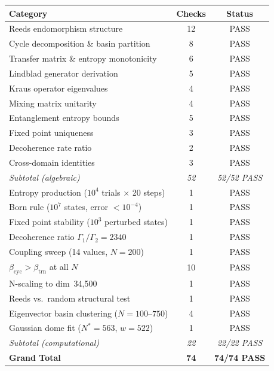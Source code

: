 \documentclass[12pt,a4paper]{article}
\theoremstyle{definition}
\theoremstyle{remark}
\begin{document}
\begin{center}
\begin{tabular}{lcc}
\toprule
\textbf{Category} & \textbf{Checks} & \textbf{Status} \\
\midrule
Reeds endomorphism structure & 12 & \textcolor{proved}{PASS} \\
Cycle decomposition \& basin partition & 8 & \textcolor{proved}{PASS} \\
Transfer matrix \& entropy monotonicity & 6 & \textcolor{proved}{PASS} \\
Lindblad generator derivation & 5 & \textcolor{proved}{PASS} \\
Kraus operator eigenvalues & 4 & \textcolor{proved}{PASS} \\
Mixing matrix unitarity & 4 & \textcolor{proved}{PASS} \\
Entanglement entropy bounds & 5 & \textcolor{proved}{PASS} \\
Fixed point uniqueness & 3 & \textcolor{proved}{PASS} \\
Decoherence rate ratio & 2 & \textcolor{proved}{PASS} \\
Cross-domain identities & 3 & \textcolor{proved}{PASS} \\
\midrule
\emph{Subtotal (algebraic)} & \emph{52} & \emph{52/52 PASS} \\
\midrule
Entropy production ($10^4$ trials $\times$ 20 steps) & 1 & \textcolor{proved}{PASS} \\
Born rule ($10^7$ states, error $< 10^{-4}$) & 1 & \textcolor{proved}{PASS} \\
Fixed point stability ($10^3$ perturbed states) & 1 & \textcolor{proved}{PASS} \\
Decoherence ratio $\Gamma_1/\Gamma_2 = 2340$ & 1 & \textcolor{proved}{PASS} \\
Coupling sweep (14 values, $N = 200$) & 1 & \textcolor{proved}{PASS} \\
$\beta_{\text{cyc}} > \beta_{\text{trn}}$ at all $N$ & 10 & \textcolor{proved}{PASS} \\
N-scaling to dim~34{,}500 & 1 & \textcolor{proved}{PASS} \\
Reeds vs.\ random structural test & 1 & \textcolor{proved}{PASS} \\
Eigenvector basin clustering ($N = 100$--$750$) & 4 & \textcolor{proved}{PASS} \\
Gaussian dome fit ($N^* = 563$, $w = 522$) & 1 & \textcolor{proved}{PASS} \\
\midrule
\emph{Subtotal (computational)} & \emph{22} & \emph{22/22 PASS} \\
\midrule
\textbf{Grand Total} & \textbf{74} & \textbf{74/74 PASS} \\
\bottomrule
\end{tabular}
\end{center}
\end{document}

